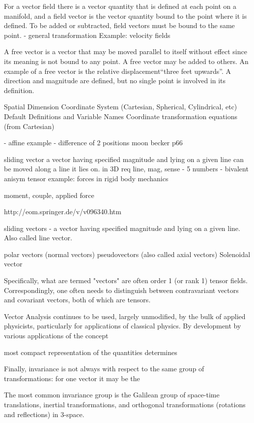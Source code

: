 \documentclass{llncs}
\begin{document}
For a vector field there is a vector quantity that is defined at each
point on a manifold, and a field vector is the vector quantity bound
to the point where it is defined.
To be added or subtracted, field vectors must be bound to the same point.
- general transformation
Example: velocity fields

A free vector is a vector that may be moved parallel to itself without
effect since its meaning is not bound to any point.
A free vector may be added to others.
An example of a free vector is the relative displacement``three feet
upwards''.
A direction and magnitude are defined, but no single point is
involved in its definition.

Spatial Dimension
Coordinate System (Cartesian, Spherical, Cylindrical, etc)
Default Definitions and Variable Names
Coordinate transformation equations (from Cartesian)


 - affine
example -  difference of 2 positions
moon
becker p66

sliding vector 
a vector having specified magnitude and lying on a
given line
can be moved along a line it lies on.
in 3D req line, mag, sense - 5 numbers - bivalent anisym tensor
example: forces in rigid body mechanics

moment, couple, applied force


http://eom.springer.de/v/v096340.htm

sliding vectors - a vector having specified magnitude and lying on a
given line.
Also called line vector.

polar vectors (normal vectors) 
pseudovectors  (also called axial vectors)
Solenoidal vector


Specifically, what are termed "vectors" are often order 1 (or rank 1)
tensor fields.
Correspondingly, one often needs to distinguish between contravariant
vectors and covariant vectors, both of which are tensors.

Vector Analysis continues to be used, largely unmodified, by the bulk
of applied physicists, particularly for applications of classical
physics.
By development by various applications of the concept





most compact representation of the quantities determines 

Finally, invariance is not always with respect to the same group of
transformations: for one vector it may be the 

The most common invariance group is the Galilean group of space-time
translations, inertial transformations, and orthogonal transformations
(rotations and reflections) in 3-space.
\end{document}
